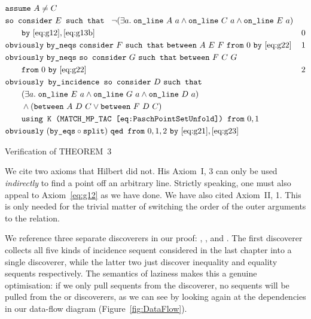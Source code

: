 \begin{boxedfigure}
  \begin{align*}
    &\code{assume}\ A\neq C\\
    &\code{so consider}\ E \code{ such that }\ \Triangle{a}{A}{C}{E}\\
    &\qquad\code{by}\ \eqref{eq:g12},\eqref{eq:g13b}& 0\\
    &\code{obviously}\ \code{by\_neqs}\ \code{consider}\ F\ \code{such that}\ \between{A}{E}{F}\ \code{from}\ 0\ \code{by}\ \eqref{eq:g22} & 1\\
    &\code{obviously}\ \code{by\_neqs}\ \code{so consider}\ G\ \code{such that}\ \between{F}{C}{G}\\&\qquad \code{from}\ 0\ \code{by}\ \eqref{eq:g22} & 2\\
    &\code{obviously by\_incidence so consider}\ D\ \code{such that}\\
    &\qquad(\exists a.\; \code{on\_line}\ E\ a \wedge \code{on\_line}\ G\ a \wedge \code{on\_line}\ D\ a)\\
    &\qquad \wedge (\between{A}{D}{C}\vee\between{F}{D}{C})\\
    &\qquad \code{using K (MATCH\_MP\_TAC \eqref{eq:PaschPointSetUnfold}) from}\ 0,1\\
    &\code{obviously}\ (\code{by\_eqs}\circ\code{split})\ \code{qed from}\ 0,1,2\ \code{by}\ \eqref{eq:g21},\eqref{eq:g23}
  \end{align*}
\caption{Verification of THEOREM~3}
\label{fig:ThreeVerification}
\end{boxedfigure}

We cite two axioms that Hilbert did not. His Axiom~I, 3 can only be used \emph{indirectly} to find a point off an arbitrary line. Strictly speaking, one must also appeal to Axiom~\ref{eq:g12} as we have done. We have also cited Axiom~II, 1. This is only needed for the trivial matter of switching the order of the outer arguments to the  relation. 

We reference three separate discoverers in our proof: , , and . The first discoverer collects all five kinds of incidence sequent considered in the last chapter into a single discoverer, while the latter two just discover inequality and equality sequents respectively. The semantics of laziness makes this a genuine optimisation: if we only pull sequents from the  discoverer, no sequents will be pulled from the  or  discoverers, as we can see by looking again at the dependencies in our data-flow diagram (Figure~\ref{fig:DataFlow}).

